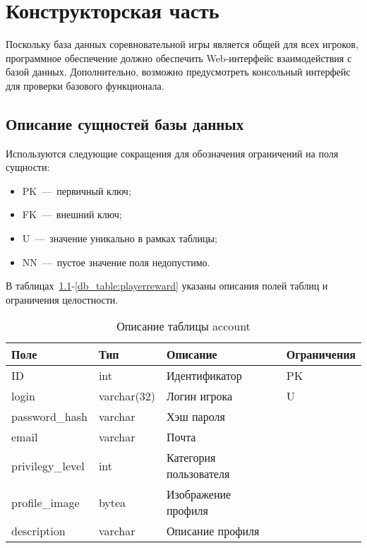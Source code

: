 \chapter{Конструкторская часть}

Поскольку база данных соревновательной игры является общей для всех игроков, программное обеспечение должно обеспечить Web-интерфейс взаимодействия с базой данных. Дополнительно, возможно предусмотреть консольный интерфейс для проверки базового функционала.
\section{Описание сущностей базы данных}

Используются следующие сокращения для обозначения ограничений на поля сущности:
\begin{itemize}
	\item PK~---~первичный ключ;
	\item FK~---~внешний ключ;
	\item U~---~значение уникально в рамках таблицы;
	\item NN~---~пустое значение поля недопустимо.
\end{itemize}

В таблицах~\ref{db_table:account}-\ref{db_table:playerreward} указаны описания полей таблиц и ограничения целостности. 

\newenvironment{dbtable}[2]{
\begin{table}[h!]
	\caption{\label{db_table:#1} #2 }
	\begin{tabular}{|p{3cm}|p{3cm}|p{6cm}|p{3cm}|}
	\hline
	Поле & Тип & Описание & Ограничения \\\hline
}
{
\end{tabular}
\end{table}
}

\begin{dbtable}{account}{Описание таблицы account}
	ID & int & Идентификатор & PK \\\hline
	login & varchar(32) & Логин игрока & U \\\hline
	password\_hash & varchar & Хэш пароля & \\\hline
	email & varchar & Почта & \\\hline
	privilegy\_level & int & Категория пользователя &\\\hline
	profile\_image & bytea & Изображение профиля &\\\hline
	description & varchar & Описание профиля &\\\hline
\end{dbtable}

